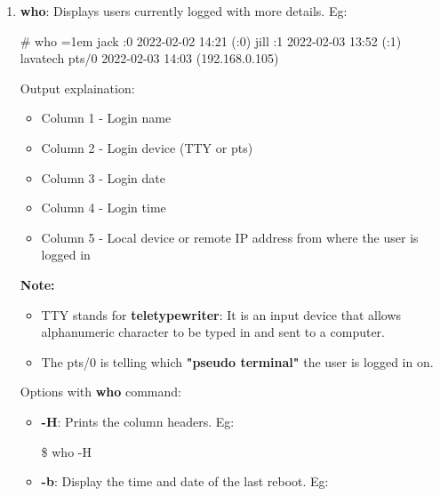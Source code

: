 \begin{flushleft}
\begin{enumerate}
		\item \textbf{who}: Displays users currently logged with more details.
		\newline
		Eg:
		\begin{tcolorbox}[breakable,notitle,boxrule=-0pt,colback=black,colframe=black]
			\color{green}
			\# who
			\newline
			\color{white}
			\font=1em
			jack   :0           2022-02-02 14:21 (:0)
			\newline
			jill :1           2022-02-03 13:52 (:1)
			\newline
			lavatech pts/0  2022-02-03 14:03 (192.168.0.105)
			\font=4pt
		\end{tcolorbox}				
		Output explaination:
			\begin{itemize}
				\item Column 1 - Login name
				\item Column 2 - Login device (TTY or pts)
				\item Column 3 - Login date
				\item Column 4 - Login time 
				\item Column 5 - Local device or remote IP address from where the user is logged in
			\end{itemize}
		\bigskip
		\begin{tcolorbox}[breakable,notitle,boxrule=-0pt,colback=yellow,colframe=yellow]
			\color{black}
			\textbf{Note:} 
			\begin{itemize}
				\item TTY stands for \textbf{teletypewriter}: It is an input device that allows alphanumeric character to be typed in and sent to a computer.
				\item The pts/0 is telling which \textbf{"pseudo terminal"} the user is logged in on. 
			\end{itemize}
		\end{tcolorbox}
		Options with \textbf{who} command:
		\begin{itemize}
			\item \textbf{-H}: Prints the column headers.
			\newline
			Eg:
			\begin{tcolorbox}[breakable,notitle,boxrule=-0pt,colback=black,colframe=black]
				\color{green}
				\$ who -H 
			\end{tcolorbox}
			\item \textbf{-b}: Display the time and date of the last reboot.
			\newline
			Eg:
			\begin{tcolorbox}[breakable,notitle,boxrule=-0pt,colback=black,colframe=black]

\end{tcolorbox}
\end{itemize}
\end{enumerate}
\end{flushleft}
